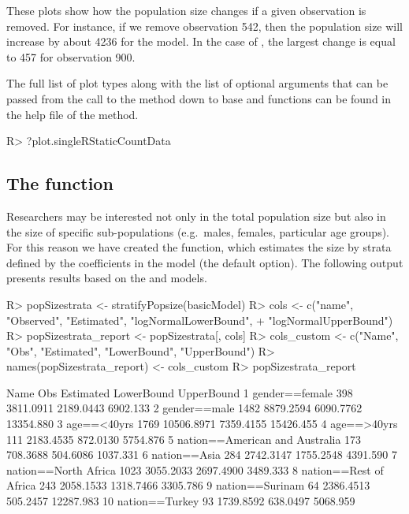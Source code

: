 \documentclass[
]{jss}
\newcommand{\1}{\mathcal{I}} \newcommand{\bZero}{\boldsymbol{0}}
\begin{document}
These plots show how the population size changes if a given observation
is removed. For instance, if we remove observation 542, then the
population size will increase by about 4236 for the 
model. In the case of , the largest change is equal to
457 for observation 900.

The full list of plot types along with the list of optional arguments
that can be passed from the call to the  method down to base
 and  functions can be found in the help file
of the  method.

\begin{CodeChunk}
\begin{CodeInput}
R> ?plot.singleRStaticCountData
\end{CodeInput}
\end{CodeChunk}

\subsection[The stratifyPopsize function]{The  function}

Researchers may be interested not only in the total population size but
also in the size of specific sub-populations (e.g.~males, females,
particular age groups). For this reason we have created the
 function, which estimates the size by strata
defined by the coefficients in the model (the default option). The
following output presents results based on the  and
 models.

\begin{CodeChunk}
\begin{CodeInput}
R> popSizestrata <- stratifyPopsize(basicModel)
R> cols <- c("name", "Observed", "Estimated", "logNormalLowerBound", 
+           "logNormalUpperBound")
R> popSizestrata_report <- popSizestrata[, cols]
R> cols_custom <- c("Name", "Obs", "Estimated", "LowerBound", "UpperBound")
R> names(popSizestrata_report) <- cols_custom
R> popSizestrata_report
\end{CodeInput}
\begin{CodeOutput}
                             Name  Obs  Estimated LowerBound UpperBound
1                  gender==female  398  3811.0911  2189.0443   6902.133
2                    gender==male 1482  8879.2594  6090.7762  13354.880
3                     age==<40yrs 1769 10506.8971  7359.4155  15426.455
4                     age==>40yrs  111  2183.4535   872.0130   5754.876
5  nation==American and Australia  173   708.3688   504.6086   1037.331
6                    nation==Asia  284  2742.3147  1755.2548   4391.590
7            nation==North Africa 1023  3055.2033  2697.4900   3489.333
8          nation==Rest of Africa  243  2058.1533  1318.7466   3305.786
9                 nation==Surinam   64  2386.4513   505.2457  12287.983
10                 nation==Turkey   93  1739.8592   638.0497   5068.959
\end{CodeOutput}
\end{CodeChunk}
\end{document}
